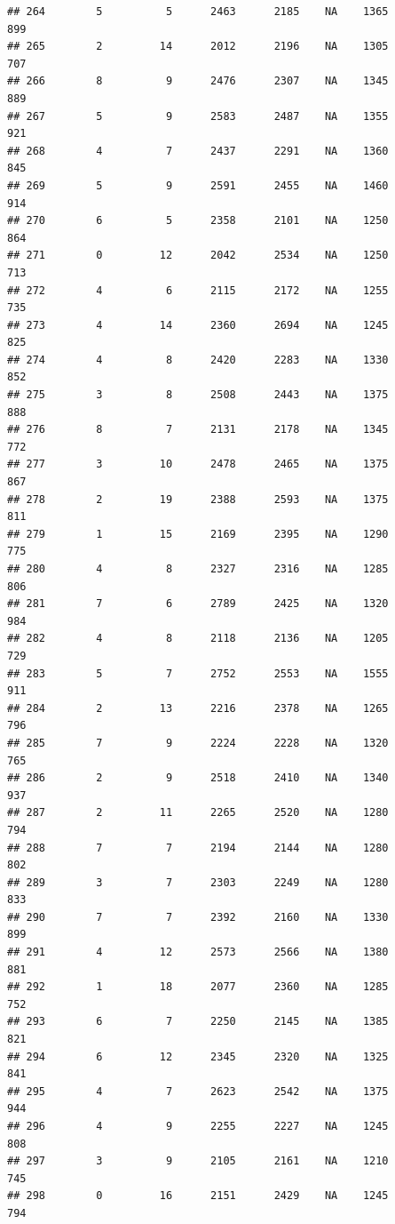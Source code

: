 \documentclass[]{book}
\begin{document}
\begin{verbatim}
## 264        5          5      2463      2185    NA    1365            899
## 265        2         14      2012      2196    NA    1305            707
## 266        8          9      2476      2307    NA    1345            889
## 267        5          9      2583      2487    NA    1355            921
## 268        4          7      2437      2291    NA    1360            845
## 269        5          9      2591      2455    NA    1460            914
## 270        6          5      2358      2101    NA    1250            864
## 271        0         12      2042      2534    NA    1250            713
## 272        4          6      2115      2172    NA    1255            735
## 273        4         14      2360      2694    NA    1245            825
## 274        4          8      2420      2283    NA    1330            852
## 275        3          8      2508      2443    NA    1375            888
## 276        8          7      2131      2178    NA    1345            772
## 277        3         10      2478      2465    NA    1375            867
## 278        2         19      2388      2593    NA    1375            811
## 279        1         15      2169      2395    NA    1290            775
## 280        4          8      2327      2316    NA    1285            806
## 281        7          6      2789      2425    NA    1320            984
## 282        4          8      2118      2136    NA    1205            729
## 283        5          7      2752      2553    NA    1555            911
## 284        2         13      2216      2378    NA    1265            796
## 285        7          9      2224      2228    NA    1320            765
## 286        2          9      2518      2410    NA    1340            937
## 287        2         11      2265      2520    NA    1280            794
## 288        7          7      2194      2144    NA    1280            802
## 289        3          7      2303      2249    NA    1280            833
## 290        7          7      2392      2160    NA    1330            899
## 291        4         12      2573      2566    NA    1380            881
## 292        1         18      2077      2360    NA    1285            752
## 293        6          7      2250      2145    NA    1385            821
## 294        6         12      2345      2320    NA    1325            841
## 295        4          7      2623      2542    NA    1375            944
## 296        4          9      2255      2227    NA    1245            808
## 297        3          9      2105      2161    NA    1210            745
## 298        0         16      2151      2429    NA    1245            794

\end{verbatim}
\end{document}
